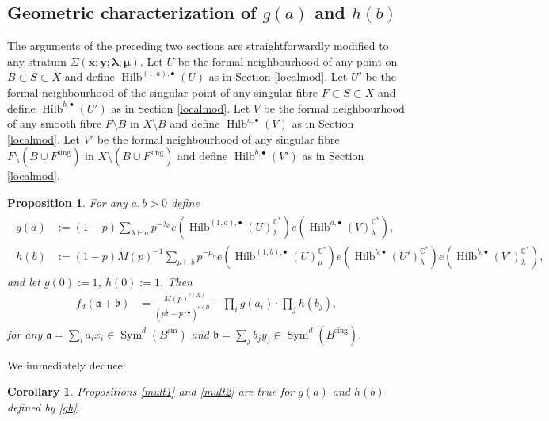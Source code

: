 \documentclass{amsart}
\newtheorem{proposition}[theorem]{Proposition}
\newtheorem{corollary}[theorem]{Corollary}
\theoremstyle{definition}
\newcommand{\CC} {\mathbb{C}}          %
\newcommand{\Sym}{\operatorname{Sym}}
\newcommand{\Hilb}{\operatorname{Hilb}}
\newcommand{\sm}{\operatorname{sm}}
\newcommand{\sing}{\operatorname{sing}}
\begin{document}
   
\subsection{Geometric characterization of $g(a)$ and $h(b)$}

The arguments of the preceding two sections are straightforwardly modified to any stratum $\Sigma(\boldsymbol{x};\boldsymbol{y};\boldsymbol{\lambda};\boldsymbol{\mu})$. Let $U$ be the formal neighbourhood of any point on $B \subset S \subset X$ and define $\Hilb^{(1,a),\bullet}(U)$ as in Section \ref{localmod}. Let $U'$ be the formal neighbourhood of the singular point of any singular fibre $F \subset S \subset X$ and define $\Hilb^{b,\bullet}(U')$ as in Section \ref{localmod}. Let $V$ be the formal neighbourhood of any smooth fibre $F \setminus B$ in $X \setminus B$ and define $\Hilb^{a,\bullet}(V)$ as in Section \ref{localmod}. Let $V'$ be the formal neighbourhood of any singular fibre $F \setminus (B \cup F^{\sing})$ in $X \setminus (B \cup F^{\sing})$ and define $\Hilb^{b,\bullet}(V')$ as in Section \ref{localmod}. 

\begin{proposition}
For any $a,b>0$ define
\begin{align}
\begin{split} \label{gh}
g(a) &:= (1-p) \sum_{\lambda \vdash a} p^{-\lambda_0} e(\Hilb^{(1,a),\bullet}(U)_{\lambda}^{\CC^*}) e(\Hilb^{a,\bullet}(V)_{\lambda}^{\CC^*}), \\
h(b) &:= (1-p) M(p)^{-1} \sum_{\mu \vdash b} p^{-\mu_0} e(\Hilb^{(1,b),\bullet}(U)_{\mu}^{\CC^*}) e(\Hilb^{b,\bullet}(U')_{\lambda}^{\CC^*}) e(\Hilb^{b,\bullet}(V')_{\lambda}^{\CC^*}),
\end{split}
\end{align}
and let $g(0) := 1$, $h(0) :=1$. Then
\begin{align*}
f_{d}(\mathfrak{a} + \mathfrak{b}) &= \frac{M(p)^{e(X)}}{(p^{\frac{1}{2}}-p^{-\frac{1}{2}})^{e(B)}} \cdot \prod_{i} g(a_i) \cdot \prod_{j} h(b_j), 
\end{align*}
for any $\mathfrak{a} = \sum_i a_i x_i \in \Sym^{d}(B^{\sm})$ and $\mathfrak{b} = \sum_j b_j y_j \in \Sym^{d}(B^{\sing})$.
\end{proposition}
   
We immediately deduce:  
\begin{corollary}
Propositions \ref{mult1} and \ref{mult2} are true for $g(a)$ and $h(b)$ defined by \eqref{gh}.
\end{corollary}   
   
\end{document}
